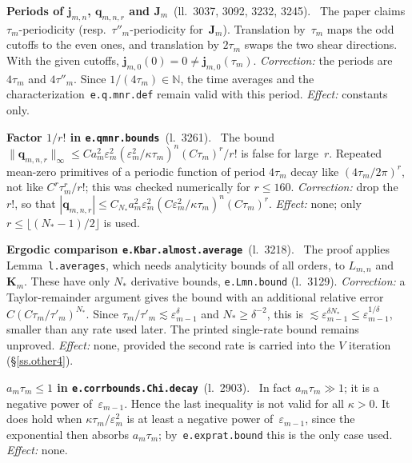 \documentclass[11pt]{amsart}
\newcommand{\ep}{\varepsilon}
\newcommand{\N}{\mathbb{N}}
\newcommand{\K}{\mathbf{K}}
\newcommand{\J}{\mathbf{J}}
\newcommand{\Ln}[1]{l.~#1}
\newcommand{\Lns}[1]{ll.~#1}
\newcommand{\lab}[1]{\texttt{#1}}
\theoremstyle{remark}
\newenvironment{erratum}[2]{\par\smallskip\noindent\textbf{#1}\ {\small(#2)}.\ }{\par}
\begin{document}
\begin{erratum}{Periods of $\mathbf j_{m,n}$, $\mathbf q_{m,n,r}$ and $\J_m$}{\Lns{3037, 3092, 3232, 3245}}
The paper claims $\tau_m$-periodicity (resp.\ $\tau''_m$-periodicity for~$\J_m$). Translation by~$\tau_m$ maps the odd cutoffs to the even ones, and translation by $2\tau_m$ swaps the two shear directions. With the given cutoffs, $\mathbf j_{m,0}(0)=0\neq\mathbf j_{m,0}(\tau_m)$. \emph{Correction:} the periods are $4\tau_m$ and $4\tau''_m$. Since $1/(4\tau_m)\in\N$, the time averages and the characterization~\lab{e.q.mnr.def} remain valid with this period. \emph{Effect:} constants only.
\end{erratum}

\begin{erratum}{Factor $1/r!$ in \lab{e.qmnr.bounds}}{\Ln{3261}}
The bound $\|\mathbf q_{m,n,r}\|_\infty\leq Ca_m^2\ep_m^2(\ep_m^2/\kappa\tau_m)^n(C\tau_m)^r/r!$ is false for large~$r$. Repeated mean-zero primitives of a periodic function of period $4\tau_m$ decay like $(4\tau_m/2\pi)^r$, not like $C^r\tau_m^r/r!$; this was checked numerically for $r\leq160$. \emph{Correction:} drop the~$r!$, so that $|\mathbf q_{m,n,r}|\leq C_{N_*}a_m^2\ep_m^2(C\ep_m^2/\kappa\tau_m)^n(C\tau_m)^r$. \emph{Effect:} none; only $r\leq\lfloor(N_*-1)/2\rfloor$ is used.
\end{erratum}

\begin{erratum}{Ergodic comparison \lab{e.Kbar.almost.average}}{\Ln{3218}}
The proof applies Lemma~\lab{l.averages}, which needs analyticity bounds of all orders, to $L_{m,n}$ and~$\K_m$. These have only $N_*$ derivative bounds, \lab{e.Lmn.bound} (\Ln{3129}). \emph{Correction:} a Taylor-remainder argument gives the bound with an additional relative error $C(C\tau_m/\tau'_m)^{N_*}$. Since $\tau_m/\tau'_m\lesssim\ep_{m-1}^\delta$ and $N_*\geq\delta^{-2}$, this is $\lesssim\ep_{m-1}^{\delta N_*}\leq\ep_{m-1}^{1/\delta}$, smaller than any rate used later. The printed single-rate bound remains unproved. \emph{Effect:} none, provided the second rate is carried into the $V$ iteration (\S\ref{ss.other4}).
\end{erratum}

\begin{erratum}{$a_m\tau_m\leq1$ in \lab{e.corrbounds.Chi.decay}}{\Ln{2903}}
In fact $a_m\tau_m\gg1$; it is a negative power of~$\ep_{m-1}$. Hence the last inequality is not valid for all $\kappa>0$. It does hold when $\kappa\tau_m/\ep_m^2$ is at least a negative power of~$\ep_{m-1}$, since the exponential then absorbs $a_m\tau_m$; by~\lab{e.exprat.bound} this is the only case used. \emph{Effect:} none.
\end{erratum}
\end{document}
